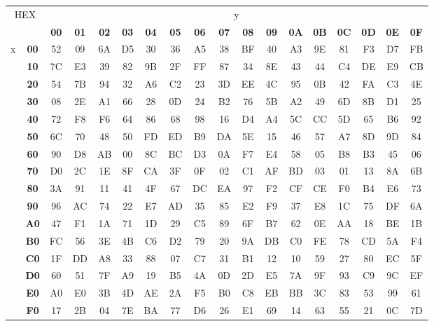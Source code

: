 \begin{tabular}{|c|c|c|c|c|c|c|c|c|c|c|c|c|c|c|c|c|c|}
  \hline
  \multicolumn{2}{|c|}{\multirow{2}{*}{HEX}} & \multicolumn{16}{c|}{y} \\ \cline{3-18} 
  \multicolumn{2}{|c|}{} & \textbf{00} & \textbf{01} & \textbf{02} & \textbf{03} & \textbf{04} & \textbf{05} & \textbf{06} & \textbf{07} & \textbf{08} & \textbf{09} & \textbf{0A} & \textbf{0B} & \textbf{0C} & \textbf{0D} & \textbf{0E} & \textbf{0F} \\ \hline
  \multirow{16}{*}{x} & \textbf{00} & 52 & 09 & 6A & D5 & 30 & 36 & A5 & 38 & BF & 40 & A3 & 9E & 81 & F3 & D7 & FB \\ \cline{2-18} 
   & \textbf{10} & 7C & E3 & 39 & 82 & 9B & 2F & FF & 87 & 34 & 8E & 43 & 44 & C4 & DE & E9 & CB \\ \cline{2-18} 
   & \textbf{20} & 54 & 7B & 94 & 32 & A6 & C2 & 23 & 3D & EE & 4C & 95 & 0B & 42 & FA & C3 & 4E \\ \cline{2-18} 
   & \textbf{30} & 08 & 2E & A1 & 66 & 28 & 0D & 24 & B2 & 76 & 5B & A2 & 49 & 6D & 8B & D1 & 25 \\ \cline{2-18} 
   & \textbf{40} & 72 & F8 & F6 & 64 & 86 & 68 & 98 & 16 & D4 & A4 & 5C & CC & 5D & 65 & B6 & 92 \\ \cline{2-18} 
   & \textbf{50} & 6C & 70 & 48 & 50 & FD & ED & B9 & DA & 5E & 15 & 46 & 57 & A7 & 8D & 9D & 84 \\ \cline{2-18} 
   & \textbf{60} & 90 & D8 & AB & 00 & 8C & BC & D3 & 0A & F7 & E4 & 58 & 05 & B8 & B3 & 45 & 06 \\ \cline{2-18} 
   & \textbf{70} & D0 & 2C & 1E & 8F & CA & 3F & 0F & 02 & C1 & AF & BD & 03 & 01 & 13 & 8A & 6B \\ \cline{2-18} 
   & \textbf{80} & 3A & 91 & 11 & 41 & 4F & 67 & DC & EA & 97 & F2 & CF & CE & F0 & B4 & E6 & 73 \\ \cline{2-18} 
   & \textbf{90} & 96 & AC & 74 & 22 & E7 & AD & 35 & 85 & E2 & F9 & 37 & E8 & 1C & 75 & DF & 6A \\ \cline{2-18} 
   & \textbf{A0} & 47 & F1 & 1A & 71 & 1D & 29 & C5 & 89 & 6F & B7 & 62 & 0E & AA & 18 & BE & 1B \\ \cline{2-18} 
   & \textbf{B0} & FC & 56 & 3E & 4B & C6 & D2 & 79 & 20 & 9A & DB & C0 & FE & 78 & CD & 5A & F4 \\ \cline{2-18} 
   & \textbf{C0} & 1F & DD & A8 & 33 & 88 & 07 & C7 & 31 & B1 & 12 & 10 & 59 & 27 & 80 & EC & 5F \\ \cline{2-18} 
   & \textbf{D0} & 60 & 51 & 7F & A9 & 19 & B5 & 4A & 0D & 2D & E5 & 7A & 9F & 93 & C9 & 9C & EF \\ \cline{2-18} 
   & \textbf{E0} & A0 & E0 & 3B & 4D & AE & 2A & F5 & B0 & C8 & EB & BB & 3C & 83 & 53 & 99 & 61 \\ \cline{2-18} 
   & \textbf{F0} & 17 & 2B & 04 & 7E & BA & 77 & D6 & 26 & E1 & 69 & 14 & 63 & 55 & 21 & 0C & 7D \\ \hline
\end{tabular}